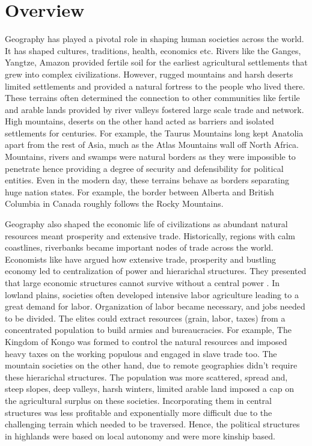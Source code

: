 \begin{sloppypar}

\section{Overview}
Geography has played a pivotal role in shaping human societies across the world. It has shaped cultures, traditions, health, economics etc. Rivers like the Ganges, Yangtze, Amazon provided fertile soil for the earliest agricultural settlements that grew into complex civilizations. However, rugged mountains and harsh deserts limited settlements and provided a natural fortress to the people who lived there. These terrains often determined the connection to other communities like fertile and arable lands provided by river valleys fostered large scale trade and network. High mountains, deserts on the other hand acted as barriers and isolated settlements for centuries. For example, the Taurus Mountains long kept Anatolia apart from the rest of Asia, much as the Atlas Mountains wall off North Africa. Mountains, rivers and swamps were natural borders as they were impossible to penetrate hence providing a degree of security and defensibility for political entities. Even in the modern day, these terrains behave as borders separating huge nation states. For example, the border between Alberta and British Columbia in Canada roughly follows the Rocky Mountains. 

\vspace{0.3cm}

Geography also shaped the economic life of civilizations as abundant natural resources meant prosperity and extensive trade. Historically, regions with calm coastlines, riverbanks became important nodes of trade across the world. Economists like \cite{smith1937wealth} have argued how extensive trade, prosperity and bustling economy led to centralization of power and hierarichal structures. They presented that large economic structures cannot survive without a central power \citep{robinson2012nations}. In lowland plains, societies often developed intensive labor agriculture leading to a great demand for labor. Organization of labor became necessary, and jobs needed to be divided. The elites could extract resources (grain, labor, taxes) from a concentrated population to build armies and bureaucracies. For example, The Kingdom of Kongo was formed to control the natural resources and imposed heavy taxes on the working populous and engaged in slave trade too. The mountain societies on the other hand, due to remote geographies didn't require these hierarichal structures. The population was more scattered, spread and,  steep slopes, deep valleys, harsh winters, limited arable land imposed a cap on the agricultural surplus on these societies. Incorporating them in central structures was less profitable and exponentially more difficult due to the challenging terrain which needed to be traversed. Hence, the political structures in highlands were based on local autonomy and were more kinship based.


\end{sloppypar}
